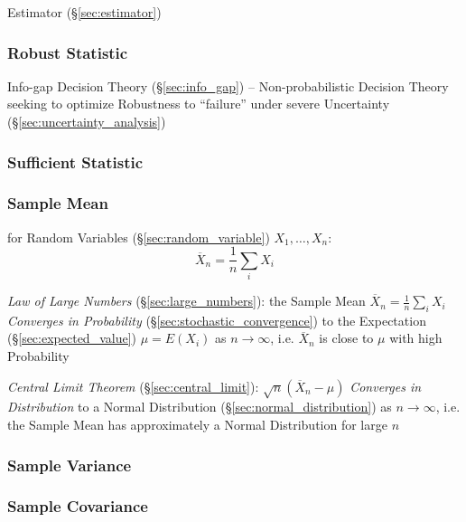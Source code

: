 Estimator (\S\ref{sec:estimator})



\subsubsection{Robust Statistic}\label{sec:robust_statistic}

\fist Info-gap Decision Theory (\S\ref{sec:info_gap}) -- Non-probabilistic
Decision Theory seeking to optimize Robustness to ``failure'' under severe
Uncertainty (\S\ref{sec:uncertainty_analysis})



\subsubsection{Sufficient Statistic}\label{sec:sufficient_statistic}

\subsubsection{Sample Mean}\label{sec:sample_mean}

for Random Variables (\S\ref{sec:random_variable}) $X_1, \ldots, X_n$:
\[
  \overline{X}_n = \frac{1}{n}\sum_i X_i
\]

\emph{Law of Large Numbers} (\S\ref{sec:large_numbers}): the Sample Mean
$\overline{X}_n = \frac{1}{n}\sum_i X_i$ \emph{Converges in Probability}
(\S\ref{sec:stochastic_convergence}) to the Expectation
(\S\ref{sec:expected_value}) $\mu = E(X_i)$ as $n \rightarrow \infty$, i.e.
$\overline{X}_n$ is close to $\mu$ with high Probability

\emph{Central Limit Theorem} (\S\ref{sec:central_limit}):
$\sqrt{n}(\overline{X}_n - \mu)$ \emph{Converges in Distribution} to a Normal
Distribution (\S\ref{sec:normal_distribution}) as $n \rightarrow \infty$, i.e.
the Sample Mean has approximately a Normal Distribution for large $n$



\subsubsection{Sample Variance}\label{sec:sample_variance}

\subsubsection{Sample Covariance}\label{sec:sample_covariance}



